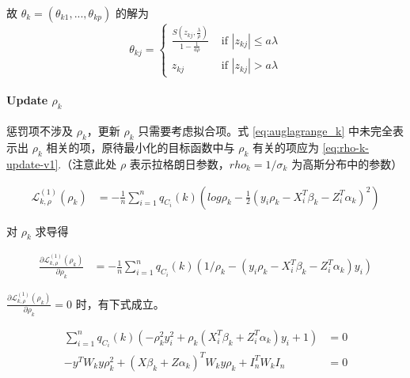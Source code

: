 \documentclass[12pt, a4paper, oneside]{article}
\numberwithin{equation}{section}
\begin{document}
故 $\theta_k = (\theta_{k1},...,\theta_{kp})$ 的解为
\begin{equation}
	\theta_{kj} = \begin{cases}\frac{S\left(z_{kj}, \frac{\lambda}{\rho}\right)}{1-\frac{1}{a \rho}} & \text { if }|z_{kj}| \leq a \lambda \\ z_{kj} & \text { if }|z_{kj}|>a \lambda\end{cases}
\end{equation}

\paragraph{Update $\rho_k$}

惩罚项不涉及 $\rho_k$，更新 $\rho_k$ 只需要考虑拟合项。式 \ref{eq:auglagrange_k} 中未完全表示出 $\rho_k$ 相关的项，原待最小化的目标函数中与 $\rho_k$ 有关的项应为 \ref{eq:rho-k-update-v1}.（注意此处 $\rho$ 表示拉格朗日参数，$rho_k = 1/\sigma_k$ 为高斯分布中的参数）

\begin{equation}
	\begin{aligned}
		\mathcal{L}_{k,\rho}^{(1)}(\rho_k) &= 
		-\frac1n \sum_{i=1}^{n} q_{C_i}(k)\left(log \rho_k - \frac12 (y_i\rho_k - X_i^T\beta_k - Z_i^T\alpha_k)^2\right)
	\end{aligned}
\label{eq:rho-k-update-v1}
\end{equation}

对 $\rho_k$ 求导得

\begin{equation}
	\begin{aligned}
		\frac{\partial\mathcal{L}_{k,\rho}^{(1)}(\rho_k)}{\partial \rho_k} &= 
		-\frac1n \sum_{i=1}^{n} q_{C_i}(k)\left(1/\rho_k - (y_i\rho_k - X_i^T\beta_k - Z_i^T\alpha_k)y_i\right)
	\end{aligned}
\end{equation}

$\frac{\partial\mathcal{L}_{k,\rho}^{(1)}(\rho_k)}{\partial \rho_k} = 0$ 时，有下式成立。

\begin{equation}
	\begin{aligned}
		\sum_{i=1}^{n}q_{C_i}(k)\left( -\rho_k^2 y_i^2 + \rho_k(X_i^T\beta_k + Z_i^T\alpha_k)y_i + 1 \right) &= 0 \\
		-y^TW_k y \rho_k^2 + (X\beta_k+Z\alpha_k)^T W_k y \rho_k + I_n^T W_k I_n &= 0\\
	\end{aligned}
	\label{eq:rho-k-update2-v1}
\end{equation}
\end{document}
